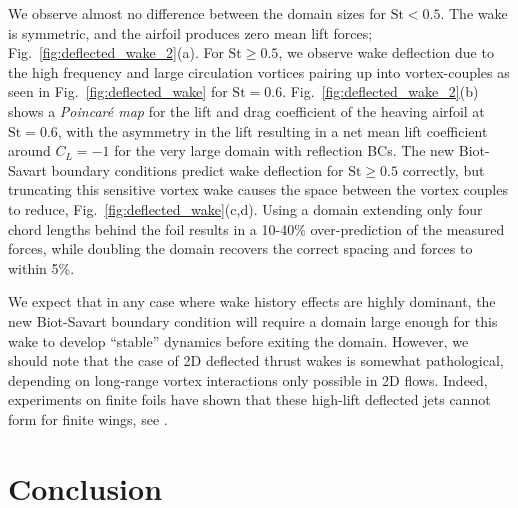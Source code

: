 \documentclass[final,1p,times]{elsarticle}
\begin{document}
We observe almost no difference between the domain sizes for $\text{St}<0.5$. The wake is symmetric, and the airfoil produces zero mean lift forces; Fig.~\ref{fig:deflected_wake_2}(a). For $\text{St}\ge 0.5$, we observe wake deflection due to the high frequency and large circulation vortices pairing up into vortex-couples as seen in Fig.~\ref{fig:deflected_wake} for $\text{St}=0.6$. Fig.~\ref{fig:deflected_wake_2}(b) shows a \emph{Poincar\'e map} for the lift and drag coefficient of the heaving airfoil at $\text{St}=0.6$, with the asymmetry in the lift resulting in a net mean lift coefficient around $C_L=-1$ for the very large domain with reflection BCs. The new Biot-Savart boundary conditions predict wake deflection for $\text{St}\ge 0.5$ correctly, but truncating this sensitive vortex wake causes the space between the vortex couples to reduce, Fig.~\ref{fig:deflected_wake}(c,d). Using a domain extending only four chord lengths behind the foil results in a 10-40\% over-prediction of the measured forces, while doubling the domain recovers the correct spacing and forces to within 5\%.

We expect that in any case where wake history effects are highly dominant, the new Biot-Savart boundary condition will require a domain large enough for this wake to develop ``stable'' dynamics before exiting the domain. However, we should note that the case of 2D deflected thrust wakes is somewhat pathological, depending on long-range vortex interactions only possible in 2D flows. Indeed, experiments on finite foils have shown that these high-lift deflected jets cannot form for finite wings, see \cite{Calderon2014OnWings, Godoy-Diana2008TransitionFoil}.
 
\section{Conclusion}
\end{document}
